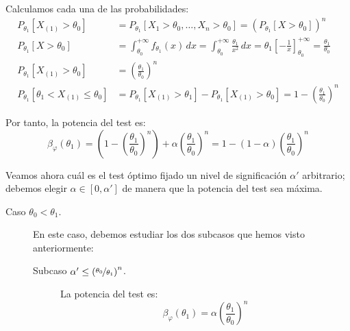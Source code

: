 \begin{ejercicio}
\begin{description}
        Calculamos cada una de las probabilidades:
        \begin{align*}
            P_{\theta_1}[X_{(1)} > \theta_0] &= P_{\theta_1}[X_1 > \theta_0, \ldots, X_n > \theta_0] = \left(P_{\theta_1}[X > \theta_0]\right)^n \\
            P_{\theta_1}[X > \theta_0] &= \int_{\theta_0}^{+\infty} f_{\theta_1}(x)\,dx = \int_{\theta_0}^{+\infty} \frac{\theta_1}{x^2}\,dx = \theta_1 \left[-\frac{1}{x}\right]_{\theta_0}^{+\infty} = \frac{\theta_1}{\theta_0} \\
            P_{\theta_1}[X_{(1)} > \theta_0] &= \left(\frac{\theta_1}{\theta_0}\right)^n \\
            P_{\theta_1}[\theta_1 < X_{(1)} \leq \theta_0] &= P_{\theta_1}[X_{(1)} > \theta_1] - P_{\theta_1}[X_{(1)} > \theta_0] = 1 - \left(\frac{\theta_1}{\theta_0}\right)^n
        \end{align*}

        Por tanto, la potencia del test es:
        \begin{equation*}
            \beta_\varphi(\theta_1) = \left(1 - \left(\frac{\theta_1}{\theta_0}\right)^n\right) + \alpha \left(\frac{\theta_1}{\theta_0}\right)^n = 1 - (1-\alpha)\left(\frac{\theta_1}{\theta_0}\right)^n
        \end{equation*}
    \end{description}

    Veamos ahora cuál es el test óptimo fijado un nivel de significación $\alpha'$ arbitrario; debemos elegir $\alpha \in [0,\alpha']$ de manera que la potencia del test sea máxima.
    \begin{description}
        \item[Caso $\theta_0 < \theta_1$.] En este caso, debemos estudiar los dos subcasos que hemos visto anteriormente:
        \begin{description}
            \item[Subcaso $\alpha' \leq \left(\nicefrac{\theta_0}{\theta_1}\right)^n$.] La potencia del test es:
            \begin{equation*}
                \beta_\varphi(\theta_1) = \alpha\left(\frac{\theta_1}{\theta_0}\right)^n
            \end{equation*}


\end{description}
\end{description}
\end{ejercicio}
